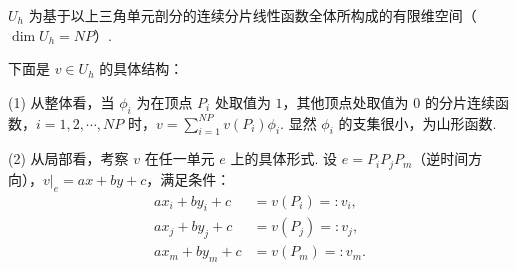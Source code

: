 \begin{definition}
 $U_h$ 为基于以上三角单元剖分的连续分片线性函数全体所构成的有限维空间（$\dim U_h = NP$）.
\end{definition}
下面是 $v \in U_h$ 的具体结构：\par
(1) 从整体看，当 $\phi_i$ 为在顶点 $P_i$ 处取值为 $1$，其他顶点处取值为 $0$ 的分片连续函数，$i=1,2,\cdots,NP$ 时，$v = \sum_{i=1}^{NP} v(P_i)\phi_i$. 显然 $\phi_i$ 的支集很小，为山形函数.\par
(2) 从局部看，考察 $v$ 在任一单元 $e$ 上的具体形式. 设 $e = P_iP_jP_m$（逆时间方向），$v|_e = ax + by + c$，满足条件：
\begin{equation*}
\begin{aligned}
ax_i + by_i + c &= v(P_i) =: v_i, \\
ax_j + by_j + c &= v(P_j) =: v_j, \\
ax_m + by_m + c &= v(P_m) =: v_m.
\end{aligned}
\end{equation*}
